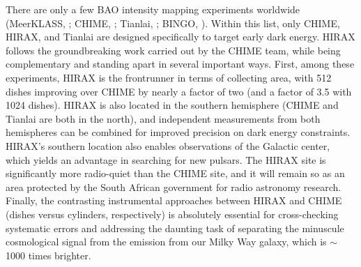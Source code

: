 \documentclass[letterpaper,11pt,preprint]{aastex}
\begin{document}
{\color{red} There are only a few BAO intensity mapping experiments
  worldwide (MeerKLASS, \citet{Santos2017}; CHIME, \citet{Bandura16};
  Tianlai, \citet{Xu2015}; BINGO, \citet{Battye2013}).  Within this
  list, only CHIME, HIRAX, and Tianlai are designed specifically to
  target early dark energy.  HIRAX follows the groundbreaking work
  carried out by the CHIME team, while being complementary and
  standing apart in several important ways.  First, among these
  experiments, HIRAX is the frontrunner in terms of collecting area,
  with 512 dishes improving over CHIME by nearly a factor of two (and
  a factor of 3.5 with 1024 dishes).  HIRAX is also located in the
  southern hemisphere (CHIME and Tianlai are both in the north), and
  independent measurements from both hemispheres can be combined for
  improved precision on dark energy constraints.  HIRAX's southern
  location also enables observations of the Galactic center, which
  yields an advantage in searching for new pulsars.  The HIRAX site is
  significantly more radio-quiet than the CHIME site, and it will
  remain so as an area protected by the South African government for
  radio astronomy research.  Finally, the contrasting instrumental
  approaches between HIRAX and CHIME (dishes versus cylinders,
  respectively) is absolutely essential for cross-checking systematic
  errors and addressing the daunting task of separating the minuscule
  cosmological signal from the emission from our Milky Way galaxy,
  which is $\sim$1000 times brighter.}

\end{document}
